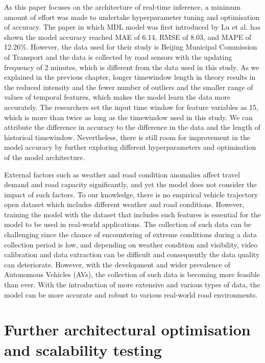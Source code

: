 \documentclass[11pt]{uonthesis}
\begin{document}
As this paper focuses on the architecture of real-time inference, a minimum amount of effort was made to undertake hyperparameter tuning and optimisation of accuracy. The paper in which MDL model was first introduced by Lu et al.\cite{9284587} has shown the model accuracy reached MAE of 6.14, RMSE of 8.03, and MAPE of 12.26\%. However, the data used for their study is Beijing Municipal Commission of Transport and the data is collected by road sensors with the updating frequency of 2 minutes, which is different from the data used in this study. As we explained in the previous chapter, longer timewindow length in theory results in the reduced intensity and the fewer number of outliers and the smaller range of values of temporal features, which makes the model learn the data more accurately. The researchers set the input time window for feature variables as 15, which is more than twice as long as the timewindow used in this study. We can attribute the difference in accuracy to the difference in the data and the length of historical timewindow. Nevertheless, there is still room for improvement in the model accuracy by further exploring different hyperparameters and optimisation of the model architecture.

External factors such as weather and road condition anomalies affect travel demand and road capacity significantly\cite{WANG2023107044}, and yet the model does not consider the impact of such factors. To our knowledge, there is no empirical vehicle trajectory open dataset which includes different weather and road conditions. However, training the model with the dataset that includes such features is essential for the model to be used in real-world applications. The collection of such data can be challenging since the chance of encountering of extreme conditions during a data collection period is low, and depending on weather condition and visibility, video calibration and data extraction can be difficult and consequently the data quality can deteriorate. However, with the development and wider prevalence of Autonomous Vehicles (AVs), the collection of such data is becoming more feasible than ever. With the introduction of more extensive and various types of data, the model can be more accurate and robust to various real-world road environments. 

\section{Further architectural optimisation and scalability testing}
\end{document}
